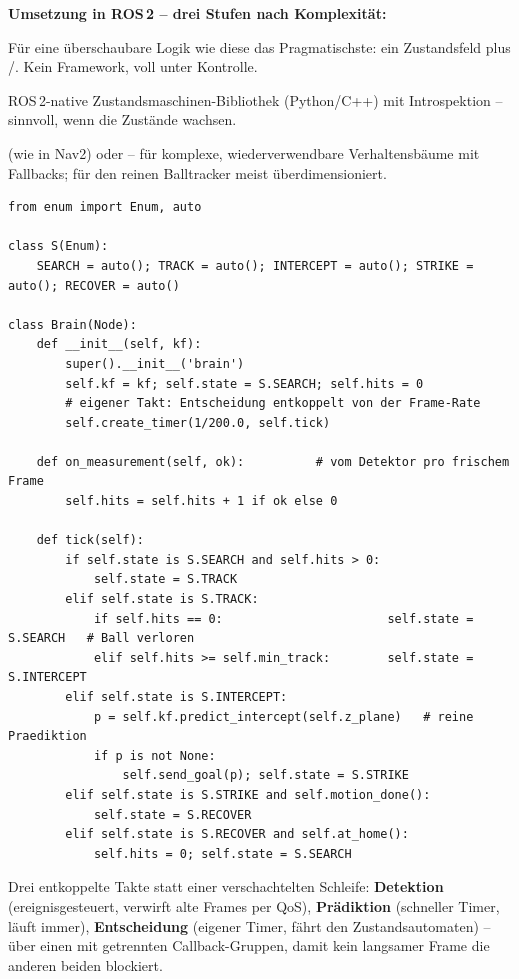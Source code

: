 \noindent\textbf{Umsetzung in ROS\,2 -- drei Stufen nach Komplexität:}
\begin{description}[style=nextline,leftmargin=1.4em]
\item[Eigenes \code{Enum} im Knoten.] Für eine überschaubare Logik wie diese das
  Pragmatischste: ein Zustandsfeld plus /. Kein Framework,
  voll unter Kontrolle.
\item[YASMIN.] ROS\,2-native Zustandsmaschinen-Bibliothek (Python/C++) mit
  Introspektion -- sinnvoll, wenn die Zustände wachsen.
\item[Behavior Trees.]  (wie in Nav2) oder
   -- für komplexe, wiederverwendbare Verhaltensbäume mit
  Fallbacks; für den reinen Balltracker meist überdimensioniert.
\end{description}

\begin{lstlisting}[style=py,caption={Zustandsautomat als Enum -- Entscheidung getrennt vom Bild-Callback}]
from enum import Enum, auto

class S(Enum):
    SEARCH = auto(); TRACK = auto(); INTERCEPT = auto(); STRIKE = auto(); RECOVER = auto()

class Brain(Node):
    def __init__(self, kf):
        super().__init__('brain')
        self.kf = kf; self.state = S.SEARCH; self.hits = 0
        # eigener Takt: Entscheidung entkoppelt von der Frame-Rate
        self.create_timer(1/200.0, self.tick)

    def on_measurement(self, ok):          # vom Detektor pro frischem Frame
        self.hits = self.hits + 1 if ok else 0

    def tick(self):
        if self.state is S.SEARCH and self.hits > 0:
            self.state = S.TRACK
        elif self.state is S.TRACK:
            if self.hits == 0:                       self.state = S.SEARCH   # Ball verloren
            elif self.hits >= self.min_track:        self.state = S.INTERCEPT
        elif self.state is S.INTERCEPT:
            p = self.kf.predict_intercept(self.z_plane)   # reine Praediktion
            if p is not None:
                self.send_goal(p); self.state = S.STRIKE
        elif self.state is S.STRIKE and self.motion_done():
            self.state = S.RECOVER
        elif self.state is S.RECOVER and self.at_home():
            self.hits = 0; self.state = S.SEARCH
\end{lstlisting}

\begin{infobox}[title=Das Architektur-Prinzip in einem Satz]
Drei entkoppelte Takte statt einer verschachtelten Schleife: \textbf{Detektion}
(ereignisgesteuert, verwirft alte Frames per QoS), \textbf{Prädiktion}
(schneller Timer, läuft immer), \textbf{Entscheidung} (eigener Timer, fährt den
Zustandsautomaten) -- über einen  mit getrennten
Callback-Gruppen, damit kein langsamer Frame die anderen beiden blockiert.
\end{infobox}
